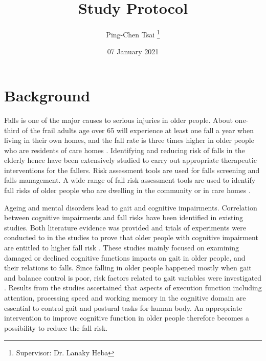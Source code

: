 \documentclass{article}
\title{Study Protocol}
\author{Ping-Chen Tsai  \thanks{Supervisor: Dr. Lanaky Heba}}
\date{07 January 2021}
\begin{document}
\maketitle

\tableofcontents
\pagebreak


\section{Background}
\begin{comment}
Aim: To place the study in the context of available evidence.
The background should be supported by appropriate references to published literature on the area of interest:
•	A thorough literature review of relevant studies and analysis, new research should build on formal review of prior evidence.
•	A brief description of the proposed study.
•	A description of the population to be studied.
•	relevant data from previous clinical trials such as efficacy, safety, tolerability

It should be written so it is easy to read and understand by someone with a basic sense of the topic who may not necessarily be an expert in the area. Some explanation of terms and concepts is likely to be beneficial. 
\end{comment}

Falls is one of the major causes to serious injuries in older people. About one-third of the frail adults age over 65 will experience at least one fall a year when living in their own homes, and the fall rate is three times higher in older people who are residents of care homes \cite{NHSFalls_2018, Robertson_2013}. Identifying and reducing risk of falls in the elderly hence have been extensively studied to carry out appropriate therapeutic interventions for the fallers. Risk assessment tools are used for falls screening and falls management. A wide range of fall risk assessment tools are used to identify fall risks of older people who are dwelling in the community \cite{PreventionofFalls2011} or in care homes \cite{Jung_2014, Kikkert_2017}. 

Ageing and mental disorders lead to gait and cognitive impairments. Correlation between cognitive impairments and fall risks have been identified in existing studies. Both literature evidence was provided and trials of experiments were conducted to in the studies to prove that older people with cognitive impairment are entitled to higher fall risk \cite{Yogev_Seligmann_2007,Martin_2012,Laurence_2017, Zhang_2019}. These studies mainly focused on examining damaged or declined cognitive functions impacts on gait in older people, and their relations to falls. Since falling in older people happened mostly when gait and balance control is poor, risk factors related to gait variables were investigated \cite{Zhang_2019, Mirelman_2012, Borowicz_2016}. Results from the studies ascertained that aspects of execution function including attention, processing speed and working memory in the cognitive domain are essential to control gait and postural tasks for human body. An appropriate intervention to improve cognitive function in older people therefore becomes a possibility to reduce the fall risk. 
\end{document}

